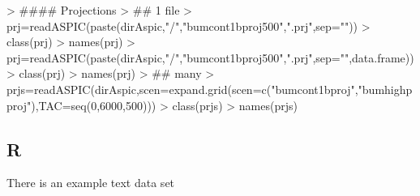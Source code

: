 \documentclass[shortnames,nojss,article]{jss}
\newenvironment{mylisting}
{\begin{list}{}{\setlength{\leftmargin}{1em}}\item\scriptsize\bfseries}
{\end{list}}
\begin{document}
\begin{mylisting}\begin{center}\begin{minipage}[H]{0.95\textwidth}\begin{shaded} 
\begin{Schunk}
\begin{Sinput}
> #### Projections
> ## 1 file
> prj=readASPIC(paste(dirAspic,"/","bumcont1bproj500",".prj",sep=""))
> class(prj)
> names(prj)
> prj=readASPIC(paste(dirAspic,"/","bumcont1bproj500",".prj",sep="",data.frame))
> class(prj)
> names(prj)
> ## many
> prjs=readASPIC(dirAspic,scen=expand.grid(scen=c("bumcont1bproj","bumhighpproj"),TAC=seq(0,6000,500)))
> class(prjs)
> names(prjs)
\end{Sinput}
\end{Schunk}
\end{shaded}\end{minipage}\end{center}\end{mylisting}

\subsection{R}

There is an example text data set 
\begin{mylisting}\begin{center}\begin{minipage}[H]{0.95\textwidth}\begin{shaded} 
\begin{Schunk}
\end{Schunk}
\end{shaded}\end{minipage}\end{center}\end{mylisting}
\end{document}
